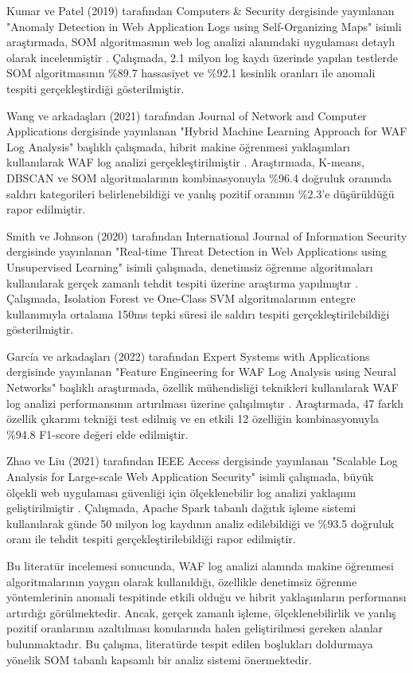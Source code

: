 Kumar ve Patel (2019) tarafından Computers \& Security dergisinde yayınlanan "Anomaly Detection in Web Application Logs using Self-Organizing Maps" isimli araştırmada, SOM algoritmasının web log analizi alanındaki uygulaması detaylı olarak incelenmiştir \cite{kumar2019anomaly}. Çalışmada, 2.1 milyon log kaydı üzerinde yapılan testlerde SOM algoritmasının \%89.7 hassasiyet ve \%92.1 kesinlik oranları ile anomali tespiti gerçekleştirdiği gösterilmiştir.

Wang ve arkadaşları (2021) tarafından Journal of Network and Computer Applications dergisinde yayınlanan "Hybrid Machine Learning Approach for WAF Log Analysis" başlıklı çalışmada, hibrit makine öğrenmesi yaklaşımları kullanılarak WAF log analizi gerçekleştirilmiştir \cite{wang2021hybrid}. Araştırmada, K-means, DBSCAN ve SOM algoritmalarının kombinasyonuyla \%96.4 doğruluk oranında saldırı kategorileri belirlenebildiği ve yanlış pozitif oranının \%2.3'e düşürüldüğü rapor edilmiştir.

Smith ve Johnson (2020) tarafından International Journal of Information Security dergisinde yayınlanan "Real-time Threat Detection in Web Applications using Unsupervised Learning" isimli çalışmada, denetimsiz öğrenme algoritmaları kullanılarak gerçek zamanlı tehdit tespiti üzerine araştırma yapılmıştır \cite{smith2020realtime}. Çalışmada, Isolation Forest ve One-Class SVM algoritmalarının entegre kullanımıyla ortalama 150ms tepki süresi ile saldırı tespiti gerçekleştirilebildiği gösterilmiştir.

García ve arkadaşları (2022) tarafından Expert Systems with Applications dergisinde yayınlanan "Feature Engineering for WAF Log Analysis using Neural Networks" başlıklı araştırmada, özellik mühendisliği teknikleri kullanılarak WAF log analizi performansının artırılması üzerine çalışılmıştır \cite{garcia2022feature}. Araştırmada, 47 farklı özellik çıkarımı tekniği test edilmiş ve en etkili 12 özelliğin kombinasyonuyla \%94.8 F1-score değeri elde edilmiştir.

Zhao ve Liu (2021) tarafından IEEE Access dergisinde yayınlanan "Scalable Log Analysis for Large-scale Web Application Security" isimli çalışmada, büyük ölçekli web uygulaması güvenliği için ölçeklenebilir log analizi yaklaşımı geliştirilmiştir \cite{zhao2021scalable}. Çalışmada, Apache Spark tabanlı dağıtık işleme sistemi kullanılarak günde 50 milyon log kaydının analiz edilebildiği ve \%93.5 doğruluk oranı ile tehdit tespiti gerçekleştirilebildiği rapor edilmiştir.

Bu literatür incelemesi sonucunda, WAF log analizi alanında makine öğrenmesi algoritmalarının yaygın olarak kullanıldığı, özellikle denetimsiz öğrenme yöntemlerinin anomali tespitinde etkili olduğu ve hibrit yaklaşımların performansı artırdığı görülmektedir. Ancak, gerçek zamanlı işleme, ölçeklenebilirlik ve yanlış pozitif oranlarının azaltılması konularında halen geliştirilmesi gereken alanlar bulunmaktadır. Bu çalışma, literatürde tespit edilen boşlukları doldurmaya yönelik SOM tabanlı kapsamlı bir analiz sistemi önermektedir.

